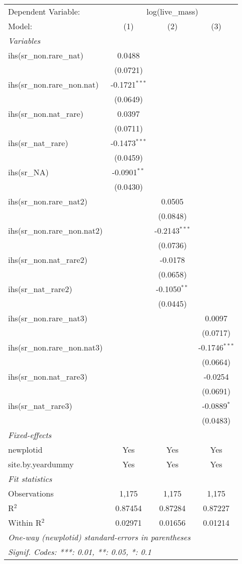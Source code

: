 \begin{tabular}{lccc}
\tabularnewline\midrule\midrule
Dependent Variable:&\multicolumn{3}{c}{log(live\_mass)}\\
Model:&(1) & (2) & (3)\\
\midrule \emph{Variables}&   &   &  \\
ihs(sr\_non.rare\_nat)&0.0488 &    &   \\
  &(0.0721) &    &   \\
ihs(sr\_non.rare\_non.nat)&-0.1721$^{***}$ &    &   \\
  &(0.0649) &    &   \\
ihs(sr\_non.nat\_rare)&0.0397 &    &   \\
  &(0.0711) &    &   \\
ihs(sr\_nat\_rare)&-0.1473$^{***}$ &    &   \\
  &(0.0459) &    &   \\
ihs(sr\_NA)&-0.0901$^{**}$ &    &   \\
  &(0.0430) &    &   \\
ihs(sr\_non.rare\_nat2)&   & 0.0505 &   \\
  &   & (0.0848) &   \\
ihs(sr\_non.rare\_non.nat2)&   & -0.2143$^{***}$ &   \\
  &   & (0.0736) &   \\
ihs(sr\_non.nat\_rare2)&   & -0.0178 &   \\
  &   & (0.0658) &   \\
ihs(sr\_nat\_rare2)&   & -0.1050$^{**}$ &   \\
  &   & (0.0445) &   \\
ihs(sr\_non.rare\_nat3)&   &    & 0.0097\\
  &   &    & (0.0717)\\
ihs(sr\_non.rare\_non.nat3)&   &    & -0.1746$^{***}$\\
  &   &    & (0.0664)\\
ihs(sr\_non.nat\_rare3)&   &    & -0.0254\\
  &   &    & (0.0691)\\
ihs(sr\_nat\_rare3)&   &    & -0.0889$^{*}$\\
  &   &    & (0.0483)\\
\midrule \emph{Fixed-effects}&   &   &  \\
newplotid & Yes & Yes & Yes\\
site.by.yeardummy & Yes & Yes & Yes\\
\midrule \emph{Fit statistics}&  & & \\
Observations & 1,175&1,175&1,175\\
R$^2$ & 0.87454&0.87284&0.87227\\
Within R$^2$ & 0.02971&0.01656&0.01214\\
\midrule\midrule\multicolumn{4}{l}{\emph{One-way (newplotid) standard-errors in parentheses}}\\
\multicolumn{4}{l}{\emph{Signif. Codes: ***: 0.01, **: 0.05, *: 0.1}}\\
\end{tabular}



